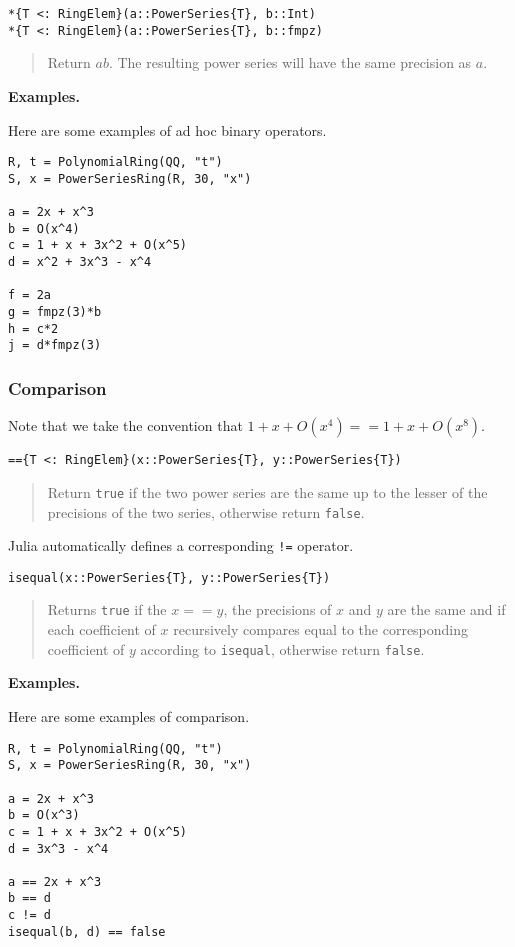 \documentclass[a4paper,10pt]{article}
\newcommand{\code}{\lstinline}
\newcommand{\desc}[1]{\vspace{-3mm}\begin{quote}#1\end{quote}}
\begin{document}
\begin{lstlisting}
*{T <: RingElem}(a::PowerSeries{T}, b::Int)
*{T <: RingElem}(a::PowerSeries{T}, b::fmpz)
\end{lstlisting}

\desc{Return $ab$. The resulting power series will have the same precision as
$a$.}

\textbf{Examples.}

Here are some examples of ad hoc binary operators.

\begin{lstlisting}
R, t = PolynomialRing(QQ, "t")
S, x = PowerSeriesRing(R, 30, "x")

a = 2x + x^3
b = O(x^4)
c = 1 + x + 3x^2 + O(x^5)
d = x^2 + 3x^3 - x^4

f = 2a
g = fmpz(3)*b
h = c*2
j = d*fmpz(3)
\end{lstlisting}

\subsubsection{Comparison}

Note that we take the convention that $1 + x + O(x^4) == 1 + x + O(x^8)$. 

\begin{lstlisting}
=={T <: RingElem}(x::PowerSeries{T}, y::PowerSeries{T})
\end{lstlisting}

\desc{Return \code{true} if the two power series are the same up to the lesser
of the precisions of the two series, otherwise return \code{false}.}

Julia automatically defines a corresponding \code{!=} operator.

\begin{lstlisting}
isequal(x::PowerSeries{T}, y::PowerSeries{T})
\end{lstlisting}

\desc{Returns \code{true} if the $x == y$, the precisions of $x$ and $y$ are
the same and if each coefficient of $x$ recursively compares equal to the
corresponding coefficient of $y$ according to \code{isequal}, otherwise return
\code{false}.}

\textbf{Examples.}

Here are some examples of comparison.

\begin{lstlisting}
R, t = PolynomialRing(QQ, "t")
S, x = PowerSeriesRing(R, 30, "x")

a = 2x + x^3
b = O(x^3)
c = 1 + x + 3x^2 + O(x^5)
d = 3x^3 - x^4

a == 2x + x^3
b == d
c != d
isequal(b, d) == false
\end{lstlisting}
\end{document}
